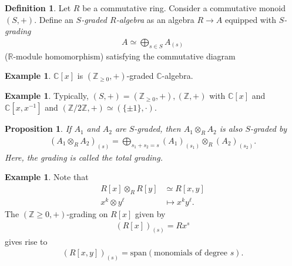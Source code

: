 \documentclass[12pt]{report}
\theoremstyle{plain}
\newtheorem{proposition}[theorem]{Proposition}
\theoremstyle{remark}
\theoremstyle{definition}
\newtheorem{definition}[theorem]{Definition}
\newtheorem{example}[theorem]{Example}
\newcommand{\Z}{\mathbb{Z}}
\newcommand{\R}{\mathbb{R}}
\newcommand{\C}{\mathbb{C}}
\begin{document}
\begin{definition}
    Let $R$ be a commutative ring. Consider a commutative monoid $(S,+)$. Define an \emph{$S$-graded $R$-algebra} as an algebra $R\to A$ equipped with \emph{$S$-grading}
    \begin{align*}
        A\simeq \bigoplus_{s\in S} A_{(s)}
    \end{align*}
    ($\R$-module homomorphism) satisfying the commutative diagram
    \begin{figure}[H]
        \centering
    \end{figure}
\end{definition}

\begin{example}
    $\C[x]$ is $(\Z_{\ge0},+)$-graded $\C$-algebra.
\end{example}

\begin{example}
    Typically, $(S,+)=(\Z_{\ge 0},+),(\Z,+)$ with $\C[x]$ and $\C[x,x^{-1}]$ and $(\Z/2\Z,+)\simeq (\{\pm 1\},\cdot)$.
\end{example}

\begin{proposition}
    If $A_1$ and $A_2$ are $S$-graded, then $A_1\otimes_R A_2$ is also $S$-graded by
    \begin{align*}
        (A_1\otimes_R A_2)_{(s)} = \bigoplus_{s_1+s_2=s} (A_1)_{(s_1)}\otimes_R (A_2)_{(s_2)}.
    \end{align*}
     Here, the grading is called the \emph{total grading}.
\end{proposition}

\begin{example}
    Note that
    \begin{align*}
        R[x] \otimes_R R[y] &\simeq R[x,y] \\
        x^k \otimes y^\ell &\mapsto x^ky^\ell.
    \end{align*}
    The $(\Z\ge 0,+)$-grading on $R[x]$ given by
    \begin{align*}
        (R[x])_{(s)}=Rx^s
    \end{align*}
    gives rise to
    \begin{align*}
        (R[x,y])_{(s)} = \mathrm{span} (\text{monomials of degree }s).
    \end{align*}
\end{example}
\end{document}
